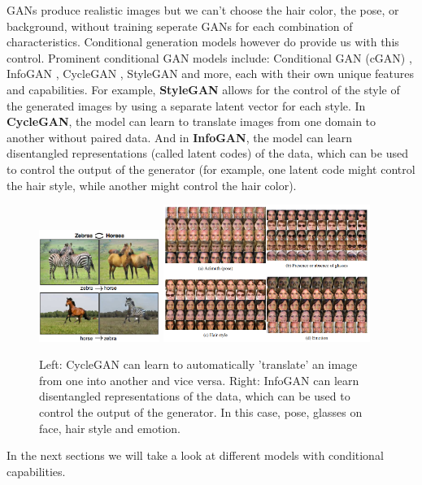 GANs produce realistic images but we can't choose the hair color, the pose, or background, without training seperate GANs for each combination of characteristics. Conditional generation models however do provide us with this control. Prominent conditional GAN models include: Conditional GAN (cGAN) \cite{cgan}, InfoGAN \cite{infogan}, CycleGAN \cite{cyclegan}, StyleGAN \cite{stylegan} and more, each with their own unique features and capabilities. For example, \textbf{StyleGAN} allows for the control of the style of the generated images by using a separate latent vector for each style. In \textbf{CycleGAN}, the model can learn to translate images from one domain to another without paired data. And in \textbf{InfoGAN}, the model can learn disentangled representations (called latent codes) of the data, which can be used to control the output of the generator (for example, one latent code might control the hair style, while another might control the hair color).

\begin{figure}
    \centering
    \includegraphics[width=0.35\textwidth]{images/gan/cyclegan.png}
    \includegraphics[width=0.6\textwidth]{images/gan/infogan.png}
    \caption{Left: CycleGAN can learn to automatically 'translate' an image from one into another and vice versa. Right: InfoGAN can learn disentangled representations of the data, which can be used to control the output of the generator. In this case, pose, glasses on face, hair style and emotion.}
\end{figure}

In the next sections we will take a look at different models with conditional capabilities.